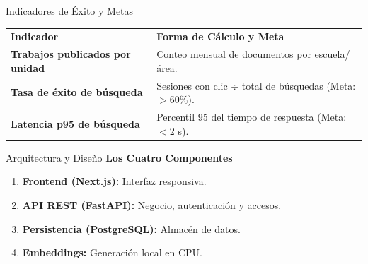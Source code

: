 \documentclass[11pt,aspectratio=169]{beamer}
\renewcommand{\arraystretch}{1.1}
\newcommand{\thead}[1]{{\color{white}\bfseries #1}}
\begin{document}
\begin{frame}{Indicadores de Éxito y Metas}
  \centering
  \renewcommand{\arraystretch}{1.25}
  \setlength{\tabcolsep}{6pt}
  \small
  \begin{tabularx}{\textwidth}{>{\bfseries}p{4.8cm} L}
    \thead{Indicador} & \thead{Forma de Cálculo y Meta} \\
    Trabajos publicados por unidad & Conteo mensual de documentos por escuela/área. \\
    Tasa de éxito de búsqueda & Sesiones con clic $\div$ total de búsquedas (Meta: $>60\%$). \\
    Latencia p95 de búsqueda & Percentil 95 del tiempo de respuesta (Meta: $<2$ s). \\
    \bottomrule
  \end{tabularx}
\end{frame}


\begin{frame}{Arquitectura y Diseño}
  \small
  {\headingfont\bfseries\color{brandlt}Los Cuatro Componentes}\\[0.1cm]
  \begin{enumerate}
    \item \textbf{Frontend (Next.js):} Interfaz responsiva.
    \item \textbf{API REST (FastAPI):} Negocio, autenticación y accesos.
    \item \textbf{Persistencia (PostgreSQL):} Almacén de datos.
    \item \textbf{Embeddings:} Generación local en CPU.
  \end{enumerate}
\end{frame}
\end{document}

